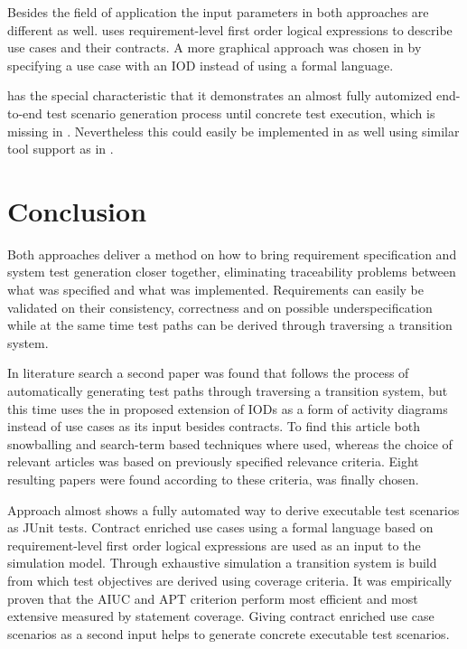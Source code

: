 Besides the field of application the input parameters in both approaches are different as well. \cite{ClementineNebut2006} uses requirement-level first order logical expressions to describe use cases and their contracts. A more graphical approach was chosen in \cite{NajlaRaza2007} by specifying a use case with an IOD instead of using a formal language. 

\cite{ClementineNebut2006} has the special characteristic that it demonstrates an almost fully automized end-to-end test scenario generation process until concrete test execution, which is missing in \cite{NajlaRaza2007}. Nevertheless this could easily be implemented in \cite{NajlaRaza2007} as well using similar tool support as in \cite{ClementineNebut2006}. 

\section{Conclusion} \label{conclusion}

Both approaches deliver a method on how to bring requirement specification and system test generation closer together, eliminating traceability problems between what was specified and what was implemented. Requirements can easily be validated on their consistency, correctness and on possible underspecification while at the same time test paths can be derived through traversing a transition system. 

In literature search a second paper was found that follows the process of automatically generating test paths through traversing a transition system, but this time uses the in \cite{ClementineNebut2006} proposed extension of IODs as a form of activity diagrams instead of use cases as its input besides contracts. To find this article both snowballing and search-term based techniques where used, whereas the choice of relevant articles was based on previously specified relevance criteria. Eight resulting papers were found according to these criteria, \cite{NajlaRaza2007} was finally chosen. 

Approach \cite{ClementineNebut2006} almost shows a fully automated way to derive executable test scenarios as JUnit tests. Contract enriched use cases using a formal language based on requirement-level first order logical expressions are used as an input to the simulation model. Through exhaustive simulation a transition system is build from which test objectives are derived using coverage criteria. It was empirically proven that the AIUC and APT criterion perform most efficient and most extensive measured by statement coverage. Giving contract enriched use case scenarios as a second input helps to generate concrete executable test scenarios. 

